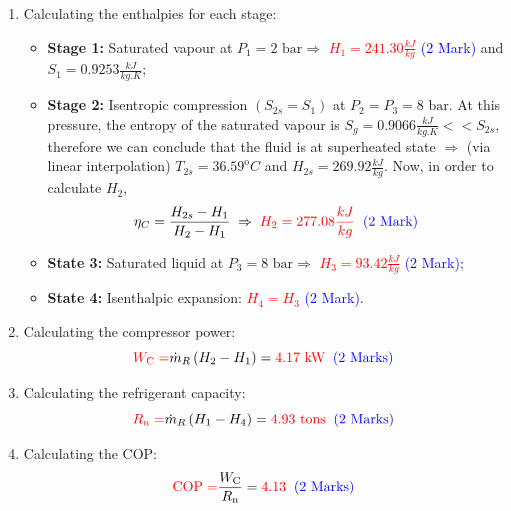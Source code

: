 \documentclass[12pt,twoside]{report}
\newcommand{\frc}{\displaystyle\frac}
\begin{document}
\begin{description}
\begin{enumerate}
\item Calculating the enthalpies for each stage:
\begin{itemize}
\item {\bf Stage 1:}  Saturated vapour at $P_{1}=2\text{ bar} \Rightarrow$ \textcolor{red}{$H_{1}=241.30\frc{kJ}{kg}$} \textcolor{blue}{(2 Mark)} and $S_{1}=0.9253\frc{kJ}{kg.K}$;
\item {\bf Stage 2:} Isentropic compression $\left(S_{2s}=S_{1}\right)$ at $P_{2}=P_{3}=8\text{ bar}$. At this pressure, the entropy of the saturated vapour is $S_{g}=0.9066\frc{kJ}{kg.K} << S_{2s}$, therefore we can conclude that the fluid is at superheated state $\Rightarrow$ (via linear interpolation) $T_{2s}=36.59^{\text{o}}C$ and $H_{2s}=269.92\frc{kJ}{kg}$. Now, in order to calculate $H_{2}$, 
\begin{displaymath}
\eta_{C}=\frc{H_{2s}-H_{1}}{H_{2}-H_{1}}\;\Rightarrow\; \textcolor{red}{H_{2}=277.08\frc{kJ}{kg}}\;\;\textcolor{blue}{\text{(2 Mark)}}
\end{displaymath}
\item {\bf State 3:} Saturated liquid at $P_{3}=8\text{ bar} \Rightarrow$ \textcolor{red}{$H_{3}=93.42\frc{kJ}{kg}$} \textcolor{blue}{(2 Mark)};
\item {\bf State 4:} Isenthalpic expansion: \textcolor{red}{$H_{4}=H_{3}$} \textcolor{blue}{(2 Mark)}.
\end{itemize}

\item Calculating the compressor power:
\begin{displaymath}
\textcolor{red}{W_{\text{C}}=}\dot{m}_{R}\left(H_{2}-H_{1}\right) = \textcolor{red}{4.17\text{ kW}}\;\;\textcolor{blue}{\text{(2 Marks)}}
\end{displaymath}

\item Calculating the refrigerant capacity:
\begin{displaymath}
\textcolor{red}{R_{\text{n}}=}\dot{m}_{R}\left(H_{1}-H_{4}\right) = \textcolor{red}{4.93\text{ tons}}\;\;\textcolor{blue}{\text{(2 Marks)}}
\end{displaymath}


\item Calculating the COP:
\begin{displaymath}
\textcolor{red}{\text{COP}=} \frc{W_{\text{C}}}{R_{\text{n}}}= \textcolor{red}{4.13}\;\;\textcolor{blue}{\text{(2 Marks)}}
\end{displaymath}
\end{enumerate}


\end{description}
\end{document}
